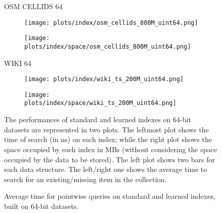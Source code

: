 \documentclass{article}
\begin{document}
\begin{figure}[!htbp]
{\begin{minipage}[t][0.98\textheight][t]{\textwidth}
    \begin{minipage}{0.05\linewidth}
    \begin{sideways}\small OSM CELLIDS 64\end{sideways}
    \end{minipage}
    \begin{minipage}{0.3\linewidth}
        \begin{figure}[H]
        \texttt{[image: plots/index/osm\_cellids\_800M\_uint64.png]}
        \end{figure}
    \end{minipage}
    \begin{minipage}{0.3\linewidth}
        \begin{figure}[H]
            \texttt{[image: plots/index/space/osm\_cellids\_800M\_uint64.png]}
        \end{figure}
    \end{minipage}
    \vspace*{-20px}

    \begin{minipage}{0.05\linewidth}
    \begin{sideways}\small WIKI 64\end{sideways}
    \end{minipage}
    \begin{minipage}{0.3\linewidth}
        \begin{figure}[H]
        \texttt{[image: plots/index/wiki\_ts\_200M\_uint64.png]}
        \end{figure}
    \end{minipage}
    \begin{minipage}{0.3\linewidth}
        \begin{figure}[H]
            \texttt{[image: plots/index/space/wiki\_ts\_200M\_uint64.png]}
        \end{figure}
    \end{minipage}
    \vfill
    
    \centering
    \begin{minipage}{\linewidth}
        The performances of standard and learned indexes on 64-bit datasets are represented in two plots. The leftmost plot shows the time of search (in ns) on each index; while the right plot shows the space occupied by each index in MBs (without considering the space occupied by the data to be stored). The left plot shows two bars for each data structure. The left/right one shows the average time to search for an existing/missing item in the collection.
    \end{minipage}
    \vspace{10px}
\end{minipage}
}
\caption{Average time for pointwise queries on standard and learned indexes, built on 64-bit datasets.}
\end{figure}
\end{document}
